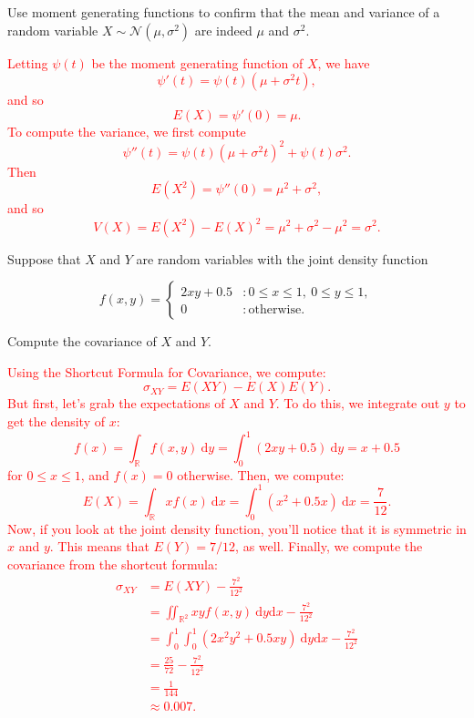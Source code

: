 \documentclass[12pt,reqno]{amsart}
\begin{document}
\prob Use moment generating functions to confirm that the mean and variance of a random variable $X \sim \mathcal{N}(\mu,\sigma^2)$ are indeed $\mu$ and $\sigma^2$.

\bigskip
\textcolor{red}{Letting $\psi(t)$ be the moment generating function of $X$, we have
	\[\psi'(t) = \psi(t) (\mu + \sigma^2 t),
	\]
and so
	\[E(X) = \psi'(0) =  \mu.
	\]
To compute the variance, we first compute
	\[\psi''(t) = \psi(t) (\mu + \sigma^2 t)^2 + \psi(t) \sigma^2.
	\]
Then
	\[E(X^2) = \psi''(0) = \mu^2 + \sigma^2,
	\]
and so
	\[V(X) = E(X^2) - E(X)^2 = \mu^2 + \sigma^2 - \mu^2 = \sigma^2.
	\]}
\bigskip












\prob Suppose that $X$ and $Y$ are random variables with the joint density function

	\[
	f(x,y) = \begin{cases}
	2xy + 0.5 & : 0 \leq x\leq 1, \ 0 \leq y \leq 1, \\
	0 & : \text{otherwise}.
	\end{cases}
	\]
	
Compute the covariance of $X$ and $Y$.

\bigskip
\textcolor{red}{Using the Shortcut Formula for Covariance, we compute:
	\[
	\sigma_{XY} = E(XY) - E(X) E(Y).
	\]
But first, let's grab the expectations of $X$ and $Y$. To do this, we integrate out $y$ to get the density of $x$:
	\[f(x) = \int_{\mathbb{R}} f(x,y) \ \text{d} y = \int_0^1 \left( 2xy+0.5\right) \ \text{d}y = x + 0.5
	\]
for $0\leq x\leq 1$, and $f(x)=0$ otherwise. Then, we compute:
	\[E(X) = \int_{\mathbb{R}} x f(x) \ \text{d}x = \int_0^1 (x^2+0.5x) \ \text{d} x = \frac{7}{12}.
	\]
Now, if you look at the joint density function, you'll notice that it is symmetric in $x$ and $y$. This means that $E(Y) = 7/12$, as well. Finally, we compute the covariance from the shortcut formula:
	\begin{align*}
	\sigma_{XY} &= E(XY) - \frac{7^2}{12^2} \\
	&= \iint_{\mathbb{R}^2} xy f(x,y) \ \text{d}y \text{d}x - \frac{7^2}{12^2} \\
	&= \int_0^1 \int_0^1 (2x^2y^2 + 0.5xy) \ \text{d}y \text{d}x - \frac{7^2}{12^2} \\
	&= \frac{25}{72} - \frac{7^2}{12^2} \\
	&= \frac{1}{144} \\
	&\approx 0.007.
	\end{align*}}
\bigskip
\end{document}
